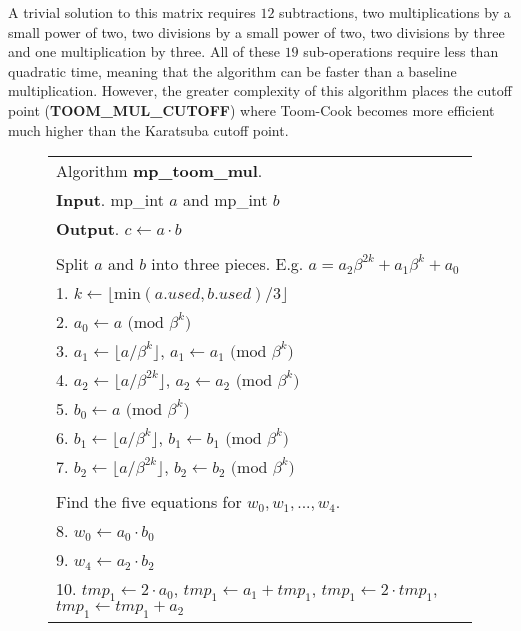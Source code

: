 \documentclass[b5paper]{book}
\begin{document}
A trivial solution to this matrix requires $12$ subtractions, two multiplications by a small power of two, two divisions by a small power
of two, two divisions by three and one multiplication by three.  All of these $19$ sub-operations require less than quadratic time, meaning that
the algorithm can be faster than a baseline multiplication.  However, the greater complexity of this algorithm places the cutoff point
(\textbf{TOOM\_MUL\_CUTOFF}) where Toom-Cook becomes more efficient much higher than the Karatsuba cutoff point.  

\begin{figure}[!here]
\begin{small}
\begin{center}
\begin{tabular}{l}
\hline Algorithm \textbf{mp\_toom\_mul}. \\
\textbf{Input}.   mp\_int $a$ and mp\_int $b$ \\
\textbf{Output}.  $c \leftarrow  a  \cdot  b $ \\
\hline \\
Split $a$ and $b$ into three pieces.  E.g. $a = a_2 \beta^{2k} + a_1 \beta^{k} + a_0$ \\
1.  $k \leftarrow \lfloor \mbox{min}(a.used, b.used) / 3 \rfloor$ \\
2.  $a_0 \leftarrow a \mbox{ (mod }\beta^{k}\mbox{)}$ \\
3.  $a_1 \leftarrow \lfloor a / \beta^k \rfloor$, $a_1 \leftarrow a_1 \mbox{ (mod }\beta^{k}\mbox{)}$ \\
4.  $a_2 \leftarrow \lfloor a / \beta^{2k} \rfloor$, $a_2 \leftarrow a_2 \mbox{ (mod }\beta^{k}\mbox{)}$ \\
5.  $b_0 \leftarrow a \mbox{ (mod }\beta^{k}\mbox{)}$ \\
6.  $b_1 \leftarrow \lfloor a / \beta^k \rfloor$, $b_1 \leftarrow b_1 \mbox{ (mod }\beta^{k}\mbox{)}$ \\
7.  $b_2 \leftarrow \lfloor a / \beta^{2k} \rfloor$, $b_2 \leftarrow b_2 \mbox{ (mod }\beta^{k}\mbox{)}$ \\
\\
Find the five equations for $w_0, w_1, ..., w_4$. \\
8.  $w_0 \leftarrow a_0 \cdot b_0$ \\
9.  $w_4 \leftarrow a_2 \cdot b_2$ \\
10. $tmp_1 \leftarrow 2 \cdot a_0$, $tmp_1 \leftarrow a_1 + tmp_1$, $tmp_1 \leftarrow 2 \cdot tmp_1$, $tmp_1 \leftarrow tmp_1 + a_2$ \\

\end{tabular}
\end{center}
\end{small}
\end{figure}
\end{document}
